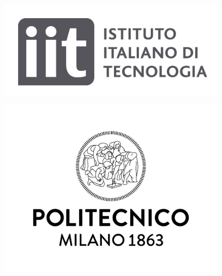 \documentclass[12pt, a4paper]{report}
\begin{document}
		

	
	
	
	
	\clearpage
	
	\begin{titlepage}
		\pagestyle{empty}
			\begin{minipage}{\linewidth}
			\hspace{-0.05\linewidth}
			\begin{minipage}{0.45\linewidth}
				\begin{figure}[H]
					\includegraphics[width=\linewidth]{Logo_IIT.png}
					
				\end{figure}
			\end{minipage}
			\hspace{0.04\linewidth}
			\begin{minipage}{0.45\linewidth}
				\begin{figure}[H]
					\includegraphics[width=\linewidth]{Logo_Politecnico_Milano.jpg}
					

\end{figure}
\end{minipage}
\end{minipage}
\end{titlepage}
\end{document}
